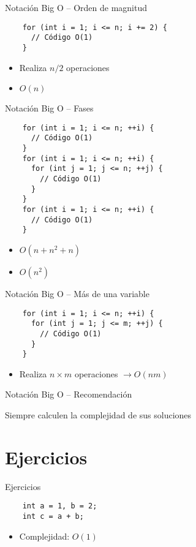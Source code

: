 \documentclass[10pt]{beamer}
\newcommand{\bi}{\begin{itemize}}
\newcommand{\ei}{\end{itemize}}
\begin{document}
\begin{frame}[fragile]{Notación Big O -- Orden de magnitud}
  \begin{verbatim}
    for (int i = 1; i <= n; i += 2) {
      // Código O(1)
    }
  \end{verbatim}
  \bi
    \item Realiza $n/2$ operaciones
    \item <2-> $O(n)$
  \ei
\end{frame}

\begin{frame}[fragile]{Notación Big O -- Fases}
  \begin{verbatim}
    for (int i = 1; i <= n; ++i) {
      // Código O(1)
    }
    for (int i = 1; i <= n; ++i) {
      for (int j = 1; j <= n; ++j) {
        // Código O(1)
      }
    }
    for (int i = 1; i <= n; ++i) {
      // Código O(1)
    }
  \end{verbatim}
  \bi
    \item $O(n + n^2 + n)$
    \item <2-> $O(n^2)$
  \ei
\end{frame}

\begin{frame}[fragile]{Notación Big O -- Más de una variable}
  \begin{verbatim}
    for (int i = 1; i <= n; ++i) {
      for (int j = 1; j <= m; ++j) {
        // Código O(1)
      }
    }
  \end{verbatim}
  \bi
    \item Realiza $n \times m$ operaciones $\rightarrow O(nm)$
  \ei
\end{frame}

\begin{frame}{Notación Big O -- Recomendación}
  \begin{center}
    Siempre calculen la complejidad de sus soluciones
  \end{center}
\end{frame}

\section{Ejercicios}

\begin{frame}[fragile]{Ejercicios}
  \begin{verbatim}
    int a = 1, b = 2;
    int c = a + b;
  \end{verbatim}
  \bi
    \item Complejidad:  $O(1)$
  \ei
\end{frame}
\end{document}
